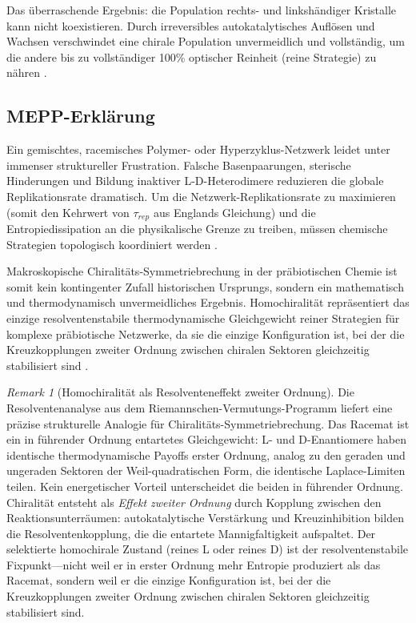 \documentclass[12pt,a4paper]{article}
\theoremstyle{remark}
\newtheorem{remark}{Remark}
\begin{document}
Das \"uberraschende Ergebnis: die Population rechts- und linksh\"andiger Kristalle kann nicht koexistieren. Durch irreversibles autokatalytisches Aufl\"osen und Wachsen verschwindet eine chirale Population unvermeidlich und vollst\"andig, um die andere bis zu vollst\"andiger 100\% optischer Reinheit (reine Strategie) zu n\"ahren \citep{HomochiralityThermo}.

\subsection{MEPP-Erkl\"arung}

Ein gemischtes, racemisches Polymer- oder Hyperzyklus-Netzwerk leidet unter immenser struktureller Frustration. Falsche Basenpaarungen, sterische Hinderungen und Bildung inaktiver L-D-Heterodimere reduzieren die globale Replikationsrate dramatisch. Um die Netzwerk-Replikationsrate zu maximieren (somit den Kehrwert von $\tau_{rep}$ aus Englands Gleichung) und die Entropiedissipation an die physikalische Grenze zu treiben, m\"ussen chemische Strategien topologisch koordiniert werden \citep{Biochirality}.

Makroskopische Chiralit\"ats-Symmetriebrechung in der pr\"abiotischen Chemie ist somit kein kontingenter Zufall historischen Ursprungs, sondern ein mathematisch und thermodynamisch unvermeidliches Ergebnis. Homochiralit\"at repr\"asentiert das einzige resolventenstabile thermodynamische Gleichgewicht reiner Strategien f\"ur komplexe pr\"abiotische Netzwerke, da sie die einzige Konfiguration ist, bei der die Kreuzkopplungen zweiter Ordnung zwischen chiralen Sektoren gleichzeitig stabilisiert sind \citep{Biochirality}.

\begin{remark}[Homochiralit\"at als Resolventeneffekt zweiter Ordnung]
\label{rem:chirality-resolvent}
Die Resolventenanalyse aus dem Riemannschen-Vermutungs-Programm \citep{GeigerRH2026b} liefert eine pr\"azise strukturelle Analogie f\"ur Chiralit\"ats-Symmetriebrechung. Das Racemat ist ein in f\"uhrender Ordnung entartetes Gleichgewicht: L- und D-Enantiomere haben identische thermodynamische Payoffs erster Ordnung, analog zu den geraden und ungeraden Sektoren der Weil-quadratischen Form, die identische Laplace-Limiten teilen. Kein energetischer Vorteil unterscheidet die beiden in f\"uhrender Ordnung. Chiralit\"at entsteht als \emph{Effekt zweiter Ordnung} durch Kopplung zwischen den Reaktionsunterr\"aumen: autokatalytische Verst\"arkung und Kreuzinhibition bilden die Resolventenkopplung, die die entartete Mannigfaltigkeit aufspaltet. Der selektierte homochirale Zustand (reines L oder reines D) ist der resolventenstabile Fixpunkt---nicht weil er in erster Ordnung mehr Entropie produziert als das Racemat, sondern weil er die einzige Konfiguration ist, bei der die Kreuzkopplungen zweiter Ordnung zwischen chiralen Sektoren gleichzeitig stabilisiert sind.
\end{remark}
\end{document}
